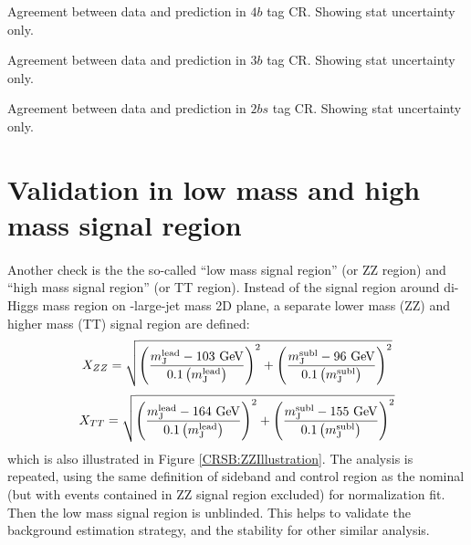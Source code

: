\begin{table}[htbp!]
\begin{center}

\end{center}
\caption{Agreement between data and prediction in $4b$ tag CR. Showing stat uncertainty only.}
\label{CRSB:Tab_4b_CR_Variations}
\end{table}

\begin{table}[htbp!]
\begin{center}

\end{center}
\caption{Agreement between data and prediction in $3b$ tag CR. Showing stat uncertainty only.}
\label{CRSB:Tab_3b_CR_Variations}
\end{table}
\begin{table}[htbp!]
\begin{center}

\end{center}
\caption{Agreement between data and prediction in $2bs$ tag CR. Showing stat uncertainty only.}
\label{CRSB:Tab_2bs_CR_Variations}
\end{table}


\section{Validation in low mass and high mass signal region}
\label{sec:boosted-ZZ-Rehearsal}
\paragraph{}
Another check is the the so-called ``low mass signal region'' (or ZZ region) and ``high mass signal region'' (or TT region). 
Instead of the signal region around di-Higgs mass region on \mleadJ-\msublJ large-\R jet mass 2D plane, a separate lower mass (ZZ) and higher mass (TT) signal region are defined: 
\begin{equation}
X_{ZZ} = \sqrt{\left(\frac{m^{\rm lead}_{\rm J} - \text{103 GeV}}{0.1 \left(m^{\rm lead}_{\rm J}\right)}\right)^2 + \left(\frac{m^{\rm subl}_{\rm J}- \text{96 GeV}}{0.1 \left(m^{\rm subl}_{\rm J}\right)}\right)^2}
\label{eq:boosted_Xzz}
\end{equation}
\begin{equation}
X_{TT} = \sqrt{\left(\frac{m^{\rm lead}_{\rm J} - \text{164 GeV}}{0.1 \left(m^{\rm lead}_{\rm J}\right)}\right)^2 + \left(\frac{m^{\rm subl}_{\rm J}- \text{155 GeV}}{0.1 \left(m^{\rm subl}_{\rm J}\right)}\right)^2}
\label{eq:boosted_Xtt}
\end{equation}
which is also illustrated in Figure \ref{CRSB:ZZIllustration}. 
The analysis is repeated, using the same definition of sideband and control region as the nominal (but with events contained in ZZ signal region excluded) for normalization fit. 
Then the low mass signal region is unblinded. 
This helps to validate the background estimation strategy, and the stability for other similar analysis.

